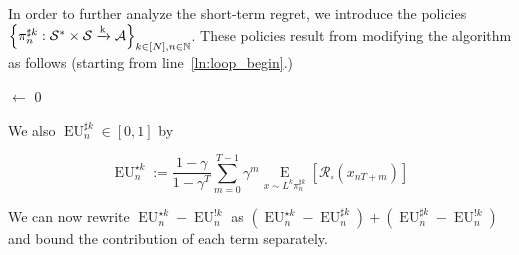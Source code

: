\documentclass[anon,12pt]{colt2018} %
\newcommand{\AP}[1]{\left(#1\right)}
\newcommand{\AB}[1]{\left[#1\right]}
\newcommand{\AC}[1]{\left\{#1\right\}}
\newcommand{\Ea}[2]{\underset{#1}{\operatorname{E}}\AB{#2}}
\newcommand{\Nats}{\mathbb{N}}
\newcommand{\K}{\xrightarrow{\textnormal{k}}}
\newcommand{\A}{\mathcal{A}}
\newcommand{\St}{\mathcal{S}}
\newcommand{\R}{\mathcal{R}}
\newcommand{\EU}{\operatorname{EU}}
\newcommand{\MP}[2]{#1#2}
\begin{document}
In order to further analyze the short-term regret, we introduce the policies\\$\AC{\pi_n^{\sharp k}: \St^* \times \St \K \A}_{k \in [N],n \in \Nats}$. These policies result from modifying the algorithm as follows (starting from line~\ref{ln:loop_begin}.)

\begin{algorithm}[h]

\setcounter{AlgoLine}{2}


\Counter$\leftarrow$ 0\;


\end{algorithm}

We also $\EU^{\sharp k}_n\in[0,1]$ by

\begin{equation}
\EU_n^{\star k}:=\frac{1-\gamma}{1-\gamma^T}\sum_{m=0}^{T-1} \gamma^m \Ea{x\sim{\MP{L^k}{\pi_n^{\sharp  k}}}}{\R_\square\AP{x_{nT+m}}}
\end{equation}

We can now rewrite $\EU^{\star k}_n-\EU^{!k}_n$ as $\AP{\EU^{\star k}_n-\EU^{\sharp k}_n}+\AP{\EU^{\sharp k}_n-\EU^{!k}_n}$ and bound the contribution of each term separately.
\end{document}

